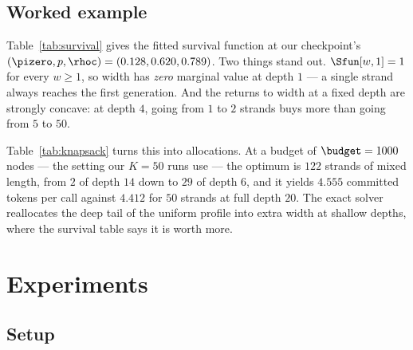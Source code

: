 \documentclass{article} %
\makeatletter
\newenvironment{ai}
  {\color{lightgray}%
   \@ifpackageloaded{caption}{\captionsetup{font={color=lightgray}}}{}%
   \let\ai@savedfloatreset\@floatboxreset
   \g@addto@macro\@floatboxreset{\color{lightgray}}}
  {\global\let\@floatboxreset\ai@savedfloatreset}
\makeatother
\begin{document}
\begin{ai}
\subsection{Worked example}
\label{sec:worked}

Table~\ref{tab:survival} gives the fitted survival function at our checkpoint's
$(\pizero, p, \rhoc) = (0.128, 0.620, 0.789)$. Two things stand out.
$\Sfun[w, 1] = 1$ for every $w \geq 1$, so width has \emph{zero} marginal value at
depth $1$ --- a single strand always reaches the first generation. And the
returns to width at a fixed depth are strongly concave: at depth $4$, going from
$1$ to $2$ strands buys more than going from $5$ to $50$.

Table~\ref{tab:knapsack} turns this into allocations. At a budget of
$\budget = 1000$ nodes --- the setting our $K = 50$ runs use --- the optimum is
$122$ strands of mixed length, from $2$ of depth $14$ down to $29$ of depth $6$,
and it yields $4.555$ committed tokens per call against $4.412$ for $50$ strands
at full depth $20$. The exact solver reallocates the deep tail of the uniform
profile into extra width at shallow depths, where the survival table says it is
worth more.

\begin{table}[t]
  \centering
  \caption{Fitted survival function $\Sfun[w, d] = \Pr[\extinct \geq d]$ for a
  homogeneous run of $w$ strands, at $(\pizero, p, \rhoc) = (0.128, 0.620,
  0.789)$. Width has no value at depth $1$ and sharply diminishing value
  thereafter.}
  \label{tab:survival}
  
\end{table}

\begin{table}[t]
  \centering
  \caption{Optimal versus uniform allocation of a node budget, under the fitted
  model. The profile column reads $\mathrm{depth}^{\mathrm{count}}$, so
  $6^{29}$ means $29$ strands of length $6$. The exact profile trades depth for
  width and gains $\approx 0.15$ committed tokens per call.}
  \label{tab:knapsack}
  
\end{table}

\section{Experiments}
\label{sec:experiments}

\subsection{Setup}


\end{ai}
\end{document}

